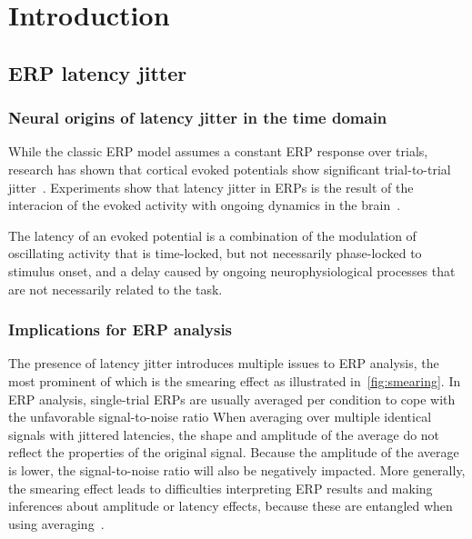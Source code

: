 \section{Introduction}


\subsection{ERP latency jitter}

\subsubsection{Neural origins of latency jitter in the time domain}
While the classic ERP model assumes a constant ERP response over trials,
research has shown that cortical evoked potentials show significant
trial-to-trial jitter~\cite{truccolo2002trial}.
Experiments show that latency jitter in ERPs is the result of the interacion of
the evoked activity with ongoing dynamics in the brain~\cite{Hasenstaub2007,
	kisley1999trial, Curto2009, Arieli1996}.

The latency of an evoked potential is a combination of the modulation of oscillating activity that is
time-locked, but not necessarily phase-locked to stimulus onset, and a
delay caused by ongoing neurophysiological processes that are not necessarily related to the task.

\subsubsection{Implications for ERP analysis}
The presence of latency jitter introduces multiple issues to ERP analysis, the
most prominent of which is the smearing effect as illustrated
in~\autoref{fig:smearing}. In ERP analysis, single-trial ERPs are usually
averaged per condition to cope with the unfavorable signal-to-noise ratio  When
averaging over multiple identical signals with jittered latencies, the shape and amplitude of the average do not reflect the properties
of the original signal. Because the amplitude of the average is lower, the
signal-to-noise ratio will also be negatively impacted.
More generally, the smearing effect leads to difficulties interpreting ERP
results and making inferences about amplitude or latency effects, because these
are entangled when using averaging~\cite{woody1967characterization, Pfefferbaum1980, McDowell2003, Verleger2005,
	Roth2007, Walhovd2008, Poli2010, Luck2014}.

